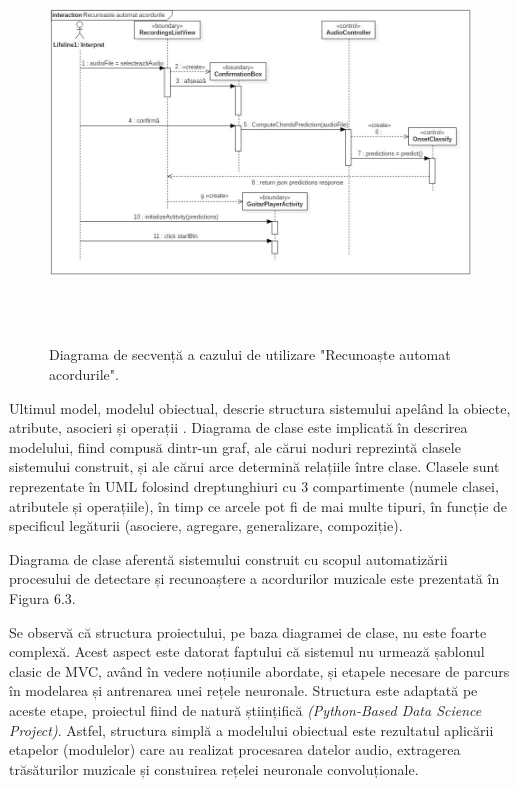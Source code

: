 \documentclass[a4paper,12pt]{report}
\begin{document}
\begin{figure}[h!]
    \centering
    \includegraphics[width=15.8cm, height=10.5cm]{..//resources//images//diagrama_de_secventa2.JPG} 
    \caption{Diagrama de secvență a cazului de utilizare "Recunoaște 
    automat acordurile". }
\end{figure}
\newpage

Ultimul model, modelul obiectual, descrie structura sistemului 
apelând la obiecte, atribute, asocieri și operații \cite{Ingineria-sistemelor-de-programare}. 
Diagrama de clase este implicată în descrirea modelului, fiind compusă dintr-un 
graf, ale cărui noduri reprezintă clasele sistemului construit, 
și ale cărui arce determină relațiile între clase. 
Clasele sunt reprezentate în UML folosind dreptunghiuri cu 3
compartimente (numele clasei, atributele și operațiile), în timp
ce arcele pot fi de mai multe tipuri, în funcție de specificul
legăturii (asociere, agregare, generalizare, compoziție). 

Diagrama de clase aferentă sistemului construit cu scopul automatizării  
procesului de detectare și recunoaștere a acordurilor muzicale este prezentată în Figura 6.3.

Se observă că structura proiectului, pe baza diagramei de clase, nu 
este foarte complexă. Acest aspect este datorat faptului că sistemul 
nu urmează șablonul clasic de MVC, având în vedere noțiunile abordate, și 
etapele necesare de parcurs în modelarea și antrenarea unei rețele neuronale.
Structura este adaptată pe aceste etape, proiectul fiind de 
natură științifică \emph{(Python-Based Data Science Project)}.
Astfel, structura simplă a modelului obiectual este rezultatul aplicării
etapelor (modulelor) care au realizat procesarea datelor audio, extragerea 
trăsăturilor muzicale și constuirea rețelei neuronale convoluționale.
\end{document}
